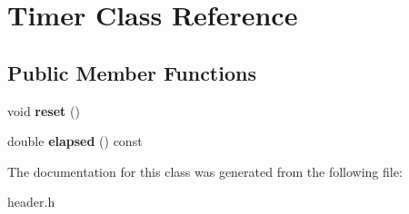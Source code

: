 \hypertarget{class_timer}{}\section{Timer Class Reference}
\label{class_timer}
\subsection*{Public Member Functions}
\begin{DoxyCompactItemize}
\item 
\mbox{\label{class_timer_a9020542d73357a4eef512eefaf57524b}} 
void {\bfseries reset} ()
\item 
\mbox{\label{class_timer_a6a89a613c2af9b0d1e5f7e4ba9e46c54}} 
double {\bfseries elapsed} () const
\end{DoxyCompactItemize}


The documentation for this class was generated from the following file\+:\begin{DoxyCompactItemize}
\item 
header.\+h\end{DoxyCompactItemize}
